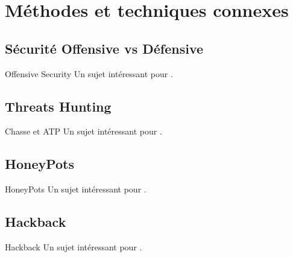 %
%



\section{Méthodes et techniques connexes}

\subsection{Sécurité Offensive vs Défensive}

\begin{techworkbox}{Offensive Security}
Un sujet intéressant pour \fichetech. 
\end{techworkbox}

\subsection{Threats Hunting}


\begin{techworkbox}{Chasse et ATP}
Un sujet intéressant pour \fichetech. 
\end{techworkbox}

%

\subsection{HoneyPots}

\begin{techworkbox}{HoneyPots}
Un sujet intéressant pour \fichetech. 
\end{techworkbox}


\subsection{Hackback}

\begin{techworkbox}{Hackback}
Un sujet intéressant pour \fichetech. 
\end{techworkbox}



